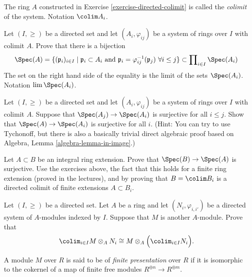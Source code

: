 \begin{definition}
\label{definition-colimit}
The ring $A$ constructed in Exercise \ref{exercise-directed-colimit}
is called the {\it colimit} of the system. Notation $\colim A_i$.
\end{definition}

\begin{exercise}
\label{exercise-prime-in-colimit}
Let $(I, \geq)$ be a directed set and let
$(A_i, \varphi_{ij})$ be a system of rings over $I$ with colimit
$A$. Prove that there is a bijection
$$
\Spec(A) = \{(\mathfrak p_i)_{i \in I} \mid
\mathfrak p_i \subset A_i \text{ and }
\mathfrak p_i = \varphi_{ij}^{-1}(\mathfrak p_j)\ \forall i \leq j\}
\subset \prod\nolimits_{i \in I} \Spec(A_i)
$$
The set on the right hand side of the equality is the limit of the sets
$\Spec(A_i)$. Notation $\lim \Spec(A_i)$.
\end{exercise}

\begin{exercise}
\label{exercise-colimit-surjective}
Let $(I, \geq)$ be a directed set and let
$(A_i, \varphi_{ij})$ be a system of rings over $I$ with colimit
$A$. Suppose that $\Spec(A_j) \to \Spec(A_i)$ is
surjective for all $i \leq j$. Show that
$\Spec(A) \to \Spec(A_i)$ is surjective for all $i$.
(Hint: You can try to use Tychonoff, but there is also a basically trivial
direct algebraic proof based on
Algebra, Lemma \ref{algebra-lemma-in-image}.)
\end{exercise}

\begin{exercise}
\label{exercise-integral-colimit-finite}
Let $A \subset B$ be an integral ring extension. Prove that
$\Spec(B) \to \Spec(A)$ is surjective.
Use the exercises above, the fact that this holds for a finite ring
extension (proved in the lectures), and by proving that
$B = \colim B_i$ is a directed colimit of finite extensions $A \subset B_i$.
\end{exercise}

\begin{exercise}
\label{exercise-colimit-tensor}
Let $(I, \geq)$ be a directed set.
Let $A$ be a ring and let $(N_i, \varphi_{i, i'})$ be a directed system of
$A$-modules indexed by $I$. Suppose that $M$ is another $A$-module. Prove
that
$$
\colim_{i\in I} M \otimes_A N_i\cong
M \otimes_A \Big( \colim_{i\in I} N_i\Big).
$$
\end{exercise}

\begin{definition}
\label{definition-finite-presentation}
A module $M$ over $R$ is said to be of {\it finite presentation} over
$R$ if it  is isomorphic to the cokernel of a map of finite free modules
$ R^{\oplus n} \to R^{\oplus m}$.
\end{definition}

